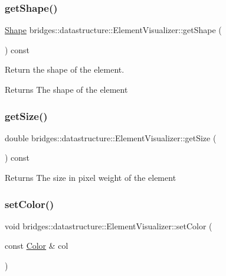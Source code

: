 \subsubsection{\texorpdfstring{getShape()}{getShape()}}
{\footnotesize\ttfamily \mbox{\hyperlink{namespacebridges_1_1datastructure_a3408f5f44d9c6062e5f3adb7e1bbb7f0}{Shape}} bridges\+::datastructure\+::\+Element\+Visualizer\+::get\+Shape (\begin{DoxyParamCaption}{ }\end{DoxyParamCaption}) const\hspace{0.3cm}{\ttfamily [inline]}}



Return the shape of the element. 

\begin{DoxyReturn}{Returns}
The shape of the element 
\end{DoxyReturn}
\mbox{\label{classbridges_1_1datastructure_1_1_element_visualizer_a5c83b976308b254521189280bfbfbc43}} 
\subsubsection{\texorpdfstring{getSize()}{getSize()}}
{\footnotesize\ttfamily double bridges\+::datastructure\+::\+Element\+Visualizer\+::get\+Size (\begin{DoxyParamCaption}{ }\end{DoxyParamCaption}) const\hspace{0.3cm}{\ttfamily [inline]}}

\begin{DoxyReturn}{Returns}
The size in pixel weight of the element 
\end{DoxyReturn}
\mbox{\label{classbridges_1_1datastructure_1_1_element_visualizer_aabf1373100f7c45b71d0caf04427644f}} 
\subsubsection{\texorpdfstring{setColor()}{setColor()}\hspace{0.1cm}{\footnotesize\ttfamily [1/2]}}
{\footnotesize\ttfamily void bridges\+::datastructure\+::\+Element\+Visualizer\+::set\+Color (\begin{DoxyParamCaption}\item[{const \mbox{\hyperlink{classbridges_1_1datastructure_1_1_color}{Color}} \&}]{col }\end{DoxyParamCaption})\hspace{0.3cm}{\ttfamily [inline]}}



